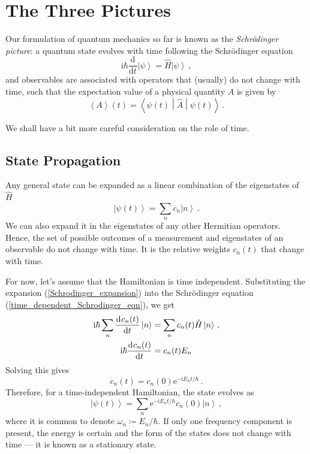 \documentclass{article}
\theoremstyle{plain}\theoremheaderfont{\normalfont\itshape}\theorembodyfont{\rmfamily}\theoremseparator{.}\newtheorem*{rem}{Remark}\newtheorem*{ex}{Example}\newtheorem*{proof}{Proof}\newtheorem*{altp}{Alternative proof}
\theoremstyle{plain}\theoremheaderfont{\normalfont\bfseries}\theorembodyfont{\rmfamily}\theoremseparator{.}\newtheorem{thm}{Theorem}[section]\newtheorem{lem}[thm]{Lemma}\newtheorem{prop}[thm]{Proposition}\newtheorem*{cor}{Corollary}\newtheorem{defn}[thm]{Definition}\newtheorem{clm}[thm]{Claim}\newtheorem{clminproof}{Claim}
\theoremstyle{break}\theoremheaderfont{\normalfont\itshape}\theorembodyfont{\rmfamily}\theoremseparator{.\medskip}\newtheorem*{proofskip}{Proof}\newtheorem*{exs}{Examples}\newtheorem*{rems}{Remarks}
\theoremstyle{break}\theoremheaderfont{\normalfont\bfseries}\theorembodyfont{\rmfamily}\theoremseparator{.\medskip}\newtheorem{lemskip}[thm]{Lemma}\newtheorem{defnskip}[thm]{Definition}\newtheorem{propskip}[thm]{Proposition}\newtheorem{thmskip}[thm]{Theorem}
\numberwithin{equation}{section}
\newcommand{\ii}{\mathrm{i}}
\newcommand{\ee}{\mathrm{e}}
\newcommand{\dv}[3][]{\frac{\mathrm{d}^{#1} #2}{{\mathrm{d} #3}^{#1}}}
\newcommand{\ket}[1]{\left| #1 \right\rangle}
\newcommand{\eval}[1]{\left\langle #1 \right\rangle}
\newcommand{\expval}[2]{\left\langle #2 \middle| #1 \middle| #2 \right\rangle}
\begin{document}
    \section{The Three Pictures}\label{Chap:Three_Pictures}
    Our formulation of quantum mechanics so far is known as the \textit{Schr\"{o}dinger picture}: a quantum state evolves with time following the Schr\"{o}dinger equation
    \begin{equation}\label{time_dependent_Schrodinger_eqn}
        \ii\hbar\dv{}{t}\ket{\psi}=\hat{H}\ket{\psi}\,,
    \end{equation}
    and observables are associated with operators that (usually) do not change with time, such that the expectation value of a physical quantity \(A\) is given by
    \begin{equation}
        \eval{A}(t)=\expval{\hat{A}}{\psi(t)}\,.
    \end{equation}

    We shall have a bit more careful consideration on the role of time.

    \subsection{State Propagation}
    Any general state can be expanded as a linear combination of the eigenstates of \(\hat{H}\)
    \begin{equation}\label{Schrodinger_expansion}
        \ket{\psi(t)}=\sum_n c_n\ket{n}\,.
    \end{equation}
    We can also expand it in the eigenstates of any other Hermitian operators. Hence, the set of possible outcomes of a measurement and eigenstates of an observable do not change with time. It is the relative weights \(c_n(t)\) that change with time.

    For now, let's assume that the Hamiltonian is time independent. Substituting the expansion (\ref{Schrodinger_expansion}) into the Schr\"{o}dinger equation (\ref{time_dependent_Schrodinger_eqn}), we get
    \begin{align}
        \ii\hbar\sum_n\dv{c_n(t)}{t}\ket{n}&=\sum_n c_n(t)\hat{H}\ket{n}\,,\notag\\
        \ii\hbar\dv{c_n(t)}{t}&=c_n(t)E_n
    \end{align}
    Solving this gives
    \begin{equation}
        c_n(t)=c_n(0)\ee^{-\ii E_nt/\hbar}\,.
    \end{equation}
    Therefore, for a time-independent Hamiltonian, the state evolves as
    \begin{equation}
        \ket{\psi(t)}=\sum_n \ee^{-\ii E_n t/\hbar}c_n(0)\ket{n}\,,
    \end{equation}
    where it is common to denote \(\omega_n\coloneqq E_n/\hbar\). If only one frequency component is present, the energy is certain and the form of the states does not change with time --- it is known as a stationary state.
\end{document}

